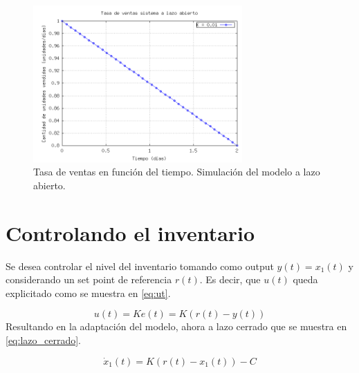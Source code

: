 \documentclass{sig-alternate}
\begin{document}
\begin{figure}[h]
\begin{center}
\includegraphics[width=8cm]{../src/lazo_abierto2.png}
\caption{\label{fig:lazo_abierto2} Tasa de ventas en función del tiempo. Simulación del modelo a lazo abierto.}
\end{center}
\end{figure}

\section{Controlando el inventario}
\label{inventary_control_section} 
Se desea controlar el nivel del inventario tomando como output $y(t)=x_{1}(t)$ y considerando
un set point de referencia $r(t)$. Es decir, que $u(t)$ queda explicitado como se muestra en \eqref{eq:ut}.

\begin{equation}
u(t)= Ke(t) = K(r(t)-y(t))\label{eq:ut}\end{equation}
Resultando en la adaptación del modelo, ahora a lazo cerrado que se muestra en \eqref{eq:lazo_cerrado}.

\begin{equation}
\dot{x}_1(t) = K(r(t) - x_{1}(t)) - C\label{eq:lazo_cerrado}\end{equation}
\end{document}
